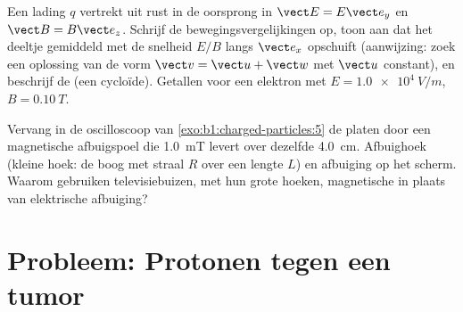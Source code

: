 \begin{exercise}[$\star\star\star$]\label{exo:b1:charged-particles:11}
Een lading $q$ vertrekt uit rust in de oorsprong in $\vect E = E\vect e_y$ en
$\vect B = B\vect e_z$. Schrijf de bewegingsvergelijkingen op, toon aan dat het
deeltje gemiddeld met de snelheid $E/B$ langs $\vect e_x$ opschuift
(aanwijzing: zoek een oplossing van de vorm $\vect v = \vect u + \vect w$ met
$\vect u$ constant), en beschrijf de  (een cycloïde). Getallen voor
een elektron met $E = \qty{1.0e4}{V/m}$, $B = \qty{0.10}{T}$.
\end{exercise}

\begin{exercise}[$\star\star\star$]\label{exo:b1:charged-particles:12}
Vervang in de oscilloscoop van \cref{exo:b1:charged-particles:5} de
platen door een magnetische afbuigspoel die \qty{1.0}{mT} levert over dezelfde
\qty{4.0}{cm}. Afbuighoek (kleine hoek: de boog met straal $R$
over een lengte $L$) en afbuiging op het scherm. Waarom gebruiken
televisiebuizen, met hun grote hoeken, magnetische in plaats van elektrische
afbuiging?
\end{exercise}

\section{Probleem: Protonen tegen een tumor}

